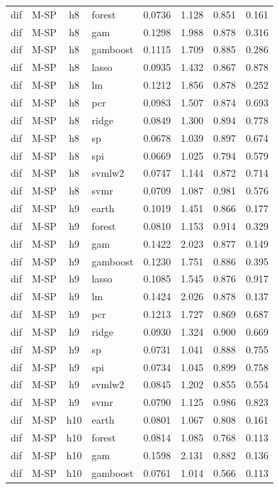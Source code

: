 \begin{ThreePartTable}
\begin{longtable}[t]{llclcccc}
dif & M-SP & h8 & forest & 0.0736 & 1.128 & 0.851 & 0.161\\
dif & M-SP & h8 & gam & 0.1298 & 1.988 & 0.878 & 0.316\\
dif & M-SP & h8 & gamboost & 0.1115 & 1.709 & 0.885 & 0.286\\
dif & M-SP & h8 & lasso & 0.0935 & 1.432 & 0.867 & 0.878\\
dif & M-SP & h8 & lm & 0.1212 & 1.856 & 0.878 & 0.252\\
dif & M-SP & h8 & pcr & 0.0983 & 1.507 & 0.874 & 0.693\\
dif & M-SP & h8 & ridge & 0.0849 & 1.300 & 0.894 & 0.778\\
dif & M-SP & h8 & sp & 0.0678 & 1.039 & 0.897 & 0.674\\
dif & M-SP & h8 & spi & 0.0669 & 1.025 & 0.794 & 0.579\\
dif & M-SP & h8 & svmlw2 & 0.0747 & 1.144 & 0.872 & 0.714\\
dif & M-SP & h8 & svmr & 0.0709 & 1.087 & 0.981 & 0.576\\
\addlinespace
dif & M-SP & h9 & earth & 0.1019 & 1.451 & 0.866 & 0.177\\
dif & M-SP & h9 & forest & 0.0810 & 1.153 & 0.914 & 0.329\\
dif & M-SP & h9 & gam & 0.1422 & 2.023 & 0.877 & 0.149\\
dif & M-SP & h9 & gamboost & 0.1230 & 1.751 & 0.886 & 0.395\\
dif & M-SP & h9 & lasso & 0.1085 & 1.545 & 0.876 & 0.917\\
dif & M-SP & h9 & lm & 0.1424 & 2.026 & 0.878 & 0.137\\
dif & M-SP & h9 & pcr & 0.1213 & 1.727 & 0.869 & 0.687\\
dif & M-SP & h9 & ridge & 0.0930 & 1.324 & 0.900 & 0.669\\
dif & M-SP & h9 & sp & 0.0731 & 1.041 & 0.888 & 0.755\\
dif & M-SP & h9 & spi & 0.0734 & 1.045 & 0.899 & 0.758\\
dif & M-SP & h9 & svmlw2 & 0.0845 & 1.202 & 0.855 & 0.554\\
dif & M-SP & h9 & svmr & 0.0790 & 1.125 & 0.986 & 0.823\\
\addlinespace
dif & M-SP & h10 & earth & 0.0801 & 1.067 & 0.808 & 0.161\\
dif & M-SP & h10 & forest & 0.0814 & 1.085 & 0.768 & 0.113\\
dif & M-SP & h10 & gam & 0.1598 & 2.131 & 0.882 & 0.136\\
dif & M-SP & h10 & gamboost & 0.0761 & 1.014 & 0.566 & 0.113\\

\end{longtable}
\end{ThreePartTable}
